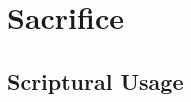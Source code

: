 \section{Sacrifice}
	\label{SACRIFICE}
	




	


\subsection{Scriptural Usage} %
	\label{SACRIFICE-SCRIPTURES}

